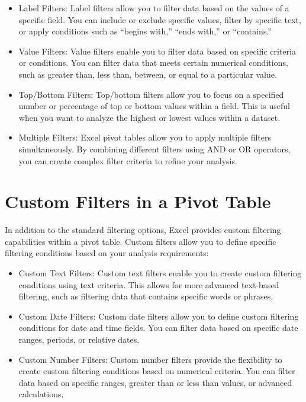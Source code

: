 \documentclass[
]{book}
\begin{document}
\begin{itemize}
\item
  Label Filters: Label filters allow you to filter data based on the values of a specific field. You can include or exclude specific values, filter by specific text, or apply conditions such as ``begins with,'' ``ends with,'' or ``contains.''
\item
  Value Filters: Value filters enable you to filter data based on specific criteria or conditions. You can filter data that meets certain numerical conditions, such as greater than, less than, between, or equal to a particular value.
\item
  Top/Bottom Filters: Top/bottom filters allow you to focus on a specified number or percentage of top or bottom values within a field. This is useful when you want to analyze the highest or lowest values within a dataset.
\item
  Multiple Filters: Excel pivot tables allow you to apply multiple filters simultaneously. By combining different filters using AND or OR operators, you can create complex filter criteria to refine your analysis.
\end{itemize}

\hypertarget{custom-filters-in-a-pivot-table}{%
\section{Custom Filters in a Pivot Table}\label{custom-filters-in-a-pivot-table}}

In addition to the standard filtering options, Excel provides custom filtering capabilities within a pivot table. Custom filters allow you to define specific filtering conditions based on your analysis requirements:

\begin{itemize}
\item
  Custom Text Filters: Custom text filters enable you to create custom filtering conditions using text criteria. This allows for more advanced text-based filtering, such as filtering data that contains specific words or phrases.
\item
  Custom Date Filters: Custom date filters allow you to define custom filtering conditions for date and time fields. You can filter data based on specific date ranges, periods, or relative dates.
\item
  Custom Number Filters: Custom number filters provide the flexibility to create custom filtering conditions based on numerical criteria. You can filter data based on specific ranges, greater than or less than values, or advanced calculations.
\end{itemize}
\end{document}
